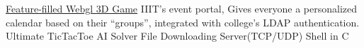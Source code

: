 \documentclass[]{deedy-resume-openfont}
\begin{document}
\begin{minipage}[t]{0.66\textwidth}

 \textbullet
\href{https://mukulhase.com/ThreeJSCarrom/}{\underline{Feature-filled Webgl 3D Game}} \textbullet  IIIT’s event portal, Gives everyone a personalized calendar based on their “groups”, integrated with college’s LDAP authentication. \textbullet Ultimate\textbf{} TicTacToe AI Solver \textbullet File Downloading Server(TCP/UDP) \textbullet Shell in C

\end{minipage} 
\end{document}
